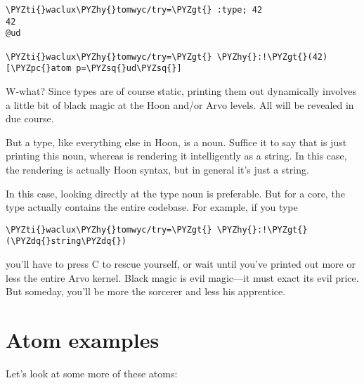 \begin{framed_shaded}
\begin{Verbatim}[fontsize=\relsize{-2.5},fontseries=b,commandchars=\\\{\}]
\PYZti{}waclux\PYZhy{}tomwyc/try=\PYZgt{} :type; 42
42
@ud

\PYZti{}waclux\PYZhy{}tomwyc/try=\PYZgt{} \PYZhy{}:!\PYZgt{}(42)
[\PYZpc{}atom p=\PYZsq{}ud\PYZsq{}]
\end{Verbatim}
\end{framed_shaded}
W-what?  Since types are of course static, printing them out
dynamically involves a little bit of black magic at the Hoon
and/or Arvo levels.  All will be revealed in due course.

But a type, like everything else in Hoon, is a noun.  Suffice it
to say that  is just printing this noun, whereas
 is rendering it intelligently as a string.  In this
case, the rendering is actually Hoon syntax, but in general it's
just a string.

In this case, looking directly at the type noun is preferable.
But for a core, the type actually contains the entire codebase.
For example, if you type

\begin{framed_shaded}
\begin{Verbatim}[fontsize=\relsize{-2.5},fontseries=b,commandchars=\\\{\}]
\PYZti{}waclux\PYZhy{}tomwyc/try=\PYZgt{} \PYZhy{}:!\PYZgt{}(\PYZdq{}string\PYZdq{})
\end{Verbatim}
\end{framed_shaded}
you'll have to press \ket C to rescue yourself, or wait until you've
printed out more or less the entire Arvo kernel.  Black magic is
evil magic---it must exact its evil price.  But someday, you'll 
be more the sorcerer and less his apprentice.

\section{Atom examples}

Let's look at some more of these atoms:


